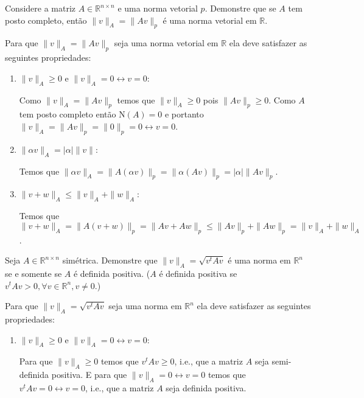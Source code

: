 \documentclass[a4paper,12pt, leqno, answers]{exam}
\begin{document}
\thispagestyle{headandfoot}
\begin{questions}
    \question Considere a matriz $A \in \mathbb{R}^{n \times n}$ e uma norma vetorial $p$. Demonstre que se $A$ tem posto completo, ent\~{a}o $\| v \|_A = \| A v \|_p$ \'{e} uma norma vetorial em $\mathbb{R}$.
    \begin{solution}
        Para que $\| v \|_A = \| A v \|_p$ seja uma norma vetorial em $\mathbb{R}$ ela deve satisfazer as seguintes propriedades:
        \begin{enumerate}
            \item $\| v \|_A \geq 0$ e $\| v \|_A = 0 \leftrightarrow v = 0$:

                Como $\| v \|_A = \| A v \|_p$ temos que $\| v \|_A \geq 0$ pois $\| A v \|_p \geq 0$. Como $A$ tem posto completo ent\~{a}o $\text{N}(A) = 0$ e portanto $\| v \|_A = \| A v \|_p = \| 0 \|_p = 0 \leftrightarrow v = 0$.

            \item $\| \alpha v \|_A = | \alpha | \| v \|$:

                Temos que $\| \alpha v \|_A = \| A \left( \alpha v \right) \|_p = \| \alpha \left( A v \right) \|_p = | \alpha | \| A v \|_p$.

            \item $\| v + w \|_A \leq \| v \|_A + \| w \|_A$:

                Temos que $\| v + w \|_A = \| A \left( v + w \right) \|_p = \| A v + A w \|_p \leq \| A v \|_p + \| A w \|_p = \| v \|_A + \| w \|_A$.
        \end{enumerate}
    \end{solution}

    \question Seja $A \in \mathbb{R}^{n \times n}$ sim\'{e}trica. Demonstre que $\| v \|_A = \sqrt{v^t A v}$ \'{e} uma norma em $\mathbb{R}^n$ se e somente se $A$ \'{e} definida positiva. ($A$ \'{e} definida positiva se $v^t A v > 0, \forall v \in \mathbb{R}^n, v \neq 0$.)
    \begin{solution}
        Para que $\| v \|_A = \sqrt{v^t A v}$ seja uma norma em $\mathbb{R}^n$ ela deve satisfazer as seguintes propriedades:
        \begin{enumerate}
            \item $\| v \|_A \geq 0$ e $\| v \|_A = 0 \leftrightarrow v = 0$:

                Para que $\| v \|_A \geq 0$ temos que $v^t A v \geq 0$, i.e., que a matriz $A$ seja semi-definida positiva. E para que $\| v \|_A = 0 \leftrightarrow v = 0$ temos que $v^t A v = 0 \leftrightarrow v = 0$, i.e., que a matriz $A$ seja definida positiva.


\end{enumerate}
\end{solution}
\end{questions}
\end{document}
